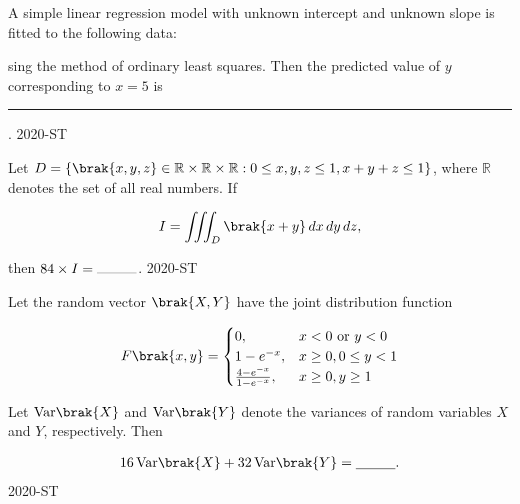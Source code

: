 \item A simple linear regression model with unknown intercept and unknown slope is fitted to the following data:
	\begin{table}[ht]
		\centering
		
	\end{table}
sing the method of ordinary least squares. Then the predicted value of $y$ corresponding to $x=5$ is \rule{1cm}{0.2pt}.
\hfill{2020-ST}


\item Let $ D = \{ \brak{x, y, z} \in \mathbb{R} \times \mathbb{R} \times \mathbb{R} : 0 \leq x, y, z \leq 1, x + y + z \leq 1 \} $, where $ \mathbb{R} $ denotes the set of all real numbers. If

\begin{align*}
I = \iiint_D \brak{x + y} \, dx \, dy \, dz,
\end{align*}

then $ 84 \times I = \rule{1cm}{0.2pt} $.
\hfill{2020-ST}


\item Let the random vector $ \brak{X, Y} $ have the joint distribution function

\begin{align*}
F\brak{x, y} = 
\begin{cases} 
0, & x < 0 \text{ or } y < 0 \\
1 - e^{-x}, & x \geq 0, 0 \leq y < 1 \\
\frac{4 - e^{-x}}{1 - e^{-x}}, & x \geq 0, y \geq 1 
\end{cases}
\end{align*}

Let $ \text{Var}\brak{X} $ and $ \text{Var}\brak{Y} $ denote the variances of random variables $ X $ and $ Y $, respectively. Then

\begin{align*}
16 \, \text{Var}\brak{X} + 32 \, \text{Var}\brak{Y} = \underline{\hspace{1cm}}.
\end{align*}
\hfill{2020-ST}

%

 
